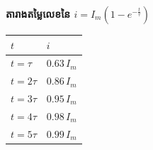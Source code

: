 \vspace{0.4em}
\noindent
\begin{minipage}[t]{0.43\textwidth}
	\vspace{0pt}
	\centering
	{\small \textbf{តារាងតម្លៃលេខនៃ $i = I_m \left( 1 - e^{-\frac{t}{\tau}} \right)$}}

	\vspace{0.35em}
	\renewcommand{\arraystretch}{1.35}
	\setlength{\arrayrulewidth}{0.7pt}
	\begin{tabular}{|>{\centering\arraybackslash}m{2.1cm}|>{\centering\arraybackslash}m{2.3cm}|}
		\hline
		\rowcolor{rowhdr}
		\textcolor{brownheader}{\textbf{$t$}} & \textcolor{brownheader}{\textbf{$i$}} \\
		\hline
		$t = \tau$   & $0.63\,I_m$ \\
		\hline
		$t = 2\tau$  & $0.86\,I_m$ \\
		\hline
		$t = 3\tau$  & $0.95\,I_m$ \\
		\hline
		$t = 4\tau$  & $0.98\,I_m$ \\
		\hline
		$t = 5\tau$  & $0.99\,I_m$ \\
		\hline
	\end{tabular}
\end{minipage}%
\hfill
